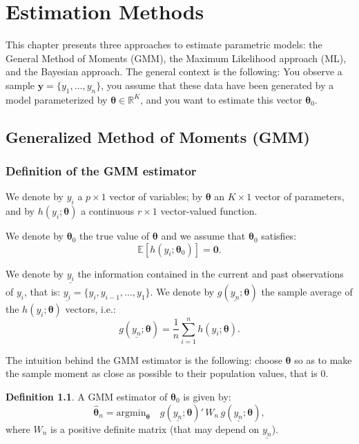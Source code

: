 \documentclass[
  12pt,
]{book}
\theoremstyle{definition}
\newtheorem{definition}{Definition}[chapter]
\theoremstyle{definition}
\theoremstyle{definition}
\theoremstyle{definition}
\theoremstyle{remark}
\begin{document}
\hypertarget{estimation-methods}{%
\chapter{Estimation Methods}\label{estimation-methods}}

This chapter presents three approaches to estimate parametric models: the General Method of Moments (GMM), the Maximum Likelihood approach (ML), and the Bayesian approach. The general context is the following: You observe a sample \(\mathbf{y}=\{y_1,\dots,y_n\}\), you assume that these data have been generated by a model parameterized by \({\boldsymbol\theta} \in \mathbb{R}^K\), and you want to estimate this vector \({\boldsymbol\theta}_0\).

\hypertarget{secGMM}{%
\section{Generalized Method of Moments (GMM)}\label{secGMM}}

\hypertarget{definition-of-the-gmm-estimator}{%
\subsection{Definition of the GMM estimator}\label{definition-of-the-gmm-estimator}}

We denote by \(y_i\) a \(p \times 1\) vector of variables; by \(\boldsymbol\theta\) an \(K \times 1\) vector of parameters, and by \(h(y_i;\boldsymbol\theta)\) a continuous \(r \times 1\) vector-valued function.

We denote by \(\boldsymbol\theta_0\) the true value of \(\boldsymbol\theta\) and we assume that \(\boldsymbol\theta_0\) satisfies:
\[
\mathbb{E}[h(y_i;\boldsymbol\theta_0)] = \mathbf{0}.
\]

We denote by \(\underline{y_i}\) the information contained in the current and past observations of \(y_i\), that is: \(\underline{y_i} = \{y_i,y_{i-1},\dots,y_1\}\). We denote by \(g(\underline{y_n};\boldsymbol\theta)\) the sample average of the \(h(y_i;\boldsymbol\theta)\) vectors, i.e.:
\[
g(\underline{y_n};\boldsymbol\theta) = \frac{1}{n} \sum_{i=1}^{n} h(y_i;\boldsymbol\theta).
\]

The intuition behind the GMM estimator is the following: choose \(\boldsymbol\theta\) so as to make the sample moment as close as possible to their population values, that is 0.

\begin{definition}
\protect\hypertarget{def:GMM}{}\label{def:GMM}A GMM estimator of \(\boldsymbol\theta_0\) is given by:
\[
\hat{\boldsymbol\theta}_n = \mbox{argmin}_{\boldsymbol\theta} \quad g(\underline{y_n};\boldsymbol\theta)'\, W_n \, g(\underline{y_n};\boldsymbol\theta),
\]
where \(W_n\) is a positive definite matrix (that may depend on \(\underline{y_n}\)).
\end{definition}
\end{document}
